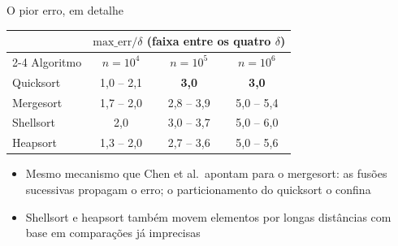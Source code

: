 \documentclass[aspectratio=169,10pt]{beamer}
\begin{document}
\begin{frame}{O pior erro, em detalhe}
  \begin{center}
    \begin{tabular}{lccc}
      \toprule
      & \multicolumn{3}{c}{$\text{max\_err}/\delta$ (faixa entre os quatro $\delta$)} \\
      \cmidrule(lr){2-4}
      Algoritmo & $n = 10^4$ & $n = 10^5$ & $n = 10^6$ \\
      \midrule
      Quicksort & 1{,}0 -- 2{,}1 & \textbf{3{,}0} & \textbf{3{,}0} \\
      Mergesort & 1{,}7 -- 2{,}0 & 2{,}8 -- 3{,}9 & 5{,}0 -- 5{,}4 \\
      Shellsort & 2{,}0 & 3{,}0 -- 3{,}7 & 5{,}0 -- 6{,}0 \\
      Heapsort  & 1{,}3 -- 2{,}0 & 2{,}7 -- 3{,}6 & 5{,}0 -- 5{,}6 \\
      \bottomrule
    \end{tabular}
  \end{center}
  \vspace{0.8em}
  \begin{itemize}
    \item Mesmo mecanismo que Chen et al.\ apontam para o mergesort: as fusões
          sucessivas propagam o erro; o particionamento do quicksort o confina
    \item Shellsort e heapsort também movem elementos por longas distâncias com
          base em comparações já imprecisas
  \end{itemize}
\end{frame}
\end{document}
